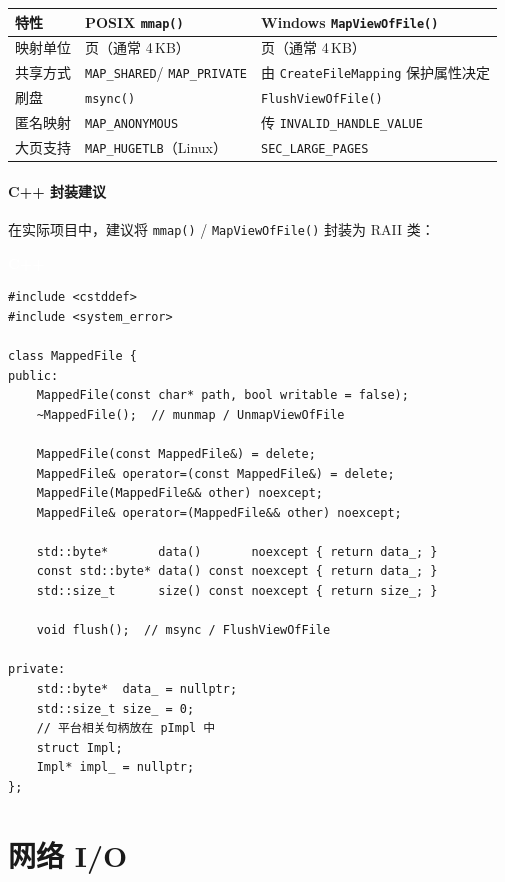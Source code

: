 \documentclass[12pt,a4paper,fontset=fandol]{ctexbook}
\newcommand{\Fn}[1]{\texttt{#1()}}
\newcommand{\Tp}[1]{\texttt{#1}}
\newcommand{\cpplabel}{%
  \noindent\begin{tcolorbox}[sharp corners,colback=algheadbg,colframe=algheadbg,
    left=6pt,right=6pt,top=2pt,bottom=2pt,boxrule=0pt]
  \textcolor{white}{\small\bfseries\sffamily C++}\end{tcolorbox}%
}
\begin{document}
\begin{compare}[title=mmap vs CreateFileMapping]
\begin{tabularx}{\textwidth}{lXX}
\toprule
\textbf{特性} & \textbf{POSIX \Fn{mmap}} & \textbf{Windows \Fn{MapViewOfFile}} \\
\midrule
映射单位 & 页（通常 4\,KB） & 页（通常 4\,KB） \\
共享方式 & \Tp{MAP\_SHARED}\newline / \Tp{MAP\_PRIVATE} & 由 \Tp{CreateFileMapping} 保护属性决定 \\
刷盘 & \Fn{msync} & \Fn{FlushViewOfFile} \\
匿名映射 & \Tp{MAP\_ANONYMOUS} & 传 \Tp{INVALID\_HANDLE\_VALUE} \\
大页支持 & \Tp{MAP\_HUGETLB}（Linux） & \Tp{SEC\_LARGE\_PAGES} \\
\bottomrule
\end{tabularx}
\end{compare}

\subsection{C++ 封装建议}

在实际项目中，建议将 \Fn{mmap} / \Fn{MapViewOfFile} 封装为 RAII 类：

\cpplabel
\begin{lstlisting}
#include <cstddef>
#include <system_error>

class MappedFile {
public:
    MappedFile(const char* path, bool writable = false);
    ~MappedFile();  // munmap / UnmapViewOfFile

    MappedFile(const MappedFile&) = delete;
    MappedFile& operator=(const MappedFile&) = delete;
    MappedFile(MappedFile&& other) noexcept;
    MappedFile& operator=(MappedFile&& other) noexcept;

    std::byte*       data()       noexcept { return data_; }
    const std::byte* data() const noexcept { return data_; }
    std::size_t      size() const noexcept { return size_; }

    void flush();  // msync / FlushViewOfFile

private:
    std::byte*  data_ = nullptr;
    std::size_t size_ = 0;
    // 平台相关句柄放在 pImpl 中
    struct Impl;
    Impl* impl_ = nullptr;
};
\end{lstlisting}

\part{网络 I/O}
\end{document}
